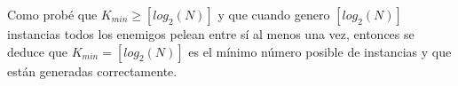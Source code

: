 Como probé que $K_{min} \geq [log_2(N)]$ y que cuando genero $[log_2(N)]$ instancias todos los enemigos pelean entre sí al menos una vez, entonces se deduce que $K_{min} = [log_2(N)]$ es el mínimo número posible de instancias y que están generadas correctamente.





 




